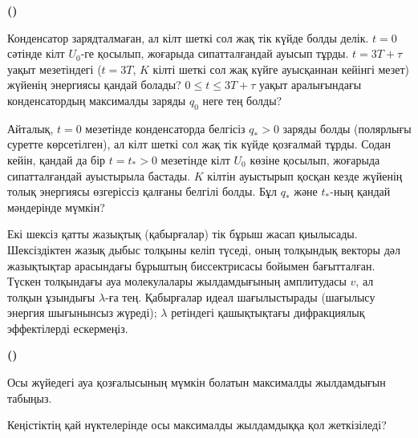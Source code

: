 \setcounter{taskstar}{0}
\begin{list}{\textbf{()}\ }{
\setlength{\leftmargin}{18pt}%
\setlength{\labelwidth}{0pt}%
\setlength{\labelsep}{0pt}%
\setlength{\itemsep}{6pt}%
\setlength{\topsep}{6pt}}
\item Конденсатор зарядталмаған, ал кілт шеткі сол жақ тік күйде болды делік. $t=0$ сәтінде кілт $U_0$-ге қосылып, жоғарыда сипатталғандай ауысып тұрды. $t=3T+\tau$ уақыт мезетіндегі ($t=3T$, $K$ кілті шеткі сол жақ күйге ауысқаннан кейінгі мезет) жүйенің энергиясы қандай болады? $0\leq t \leq 3T+\tau$ уақыт аралығындағы конденсатордың максималды заряды $q_0$ неге тең болды?
\item Айталық, $t=0$ мезетінде конденсаторда белгісіз $q_*>0$ заряды болды (полярлығы суретте көрсетілген), ал кілт шеткі сол жақ тік күйде қозғалмай тұрды. Содан кейін, қандай да бір $t=t_*>0$ мезетінде кілт $U_0$ көзіне қосылып, жоғарыда сипатталғандай ауыстырыла бастады. $K$ кілтін ауыстырып қосқан кезде жүйенің толық энергиясы өзгеріссіз қалғаны белгілі болды. Бұл $q_*$ және $t_*$-ның қандай мәндерінде мүмкін?
\end{list}


Екі шексіз қатты жазықтық (қабырғалар) тік бұрыш жасап қиылысады. Шексіздіктен жазық дыбыс толқыны келіп түседі, оның толқындық векторы дәл жазықтықтар арасындағы бұрыштың биссектрисасы бойымен бағытталған. Түскен толқындағы ауа молекулалары жылдамдығының амплитудасы $v$, ал толқын ұзындығы $\lambda$-ға тең. Қабырғалар идеал шағылыстырады (шағылысу энергия шығынынсыз жүреді); $\lambda$ ретіндегі қашықтықтағы дифракциялық эффектілерді ескермеңіз.

\setcounter{taskstar}{0}
\begin{list}{\textbf{()}\ }{
\setlength{\leftmargin}{18pt}%
\setlength{\labelwidth}{0pt}%
\setlength{\labelsep}{0pt}%
\setlength{\itemsep}{6pt}%
\setlength{\topsep}{6pt}}
\item Осы жүйедегі ауа қозғалысының мүмкін болатын максималды жылдамдығын табыңыз.
\item Кеңістіктің қай нүктелерінде осы максималды жылдамдыққа қол жеткізіледі?
\end{list}